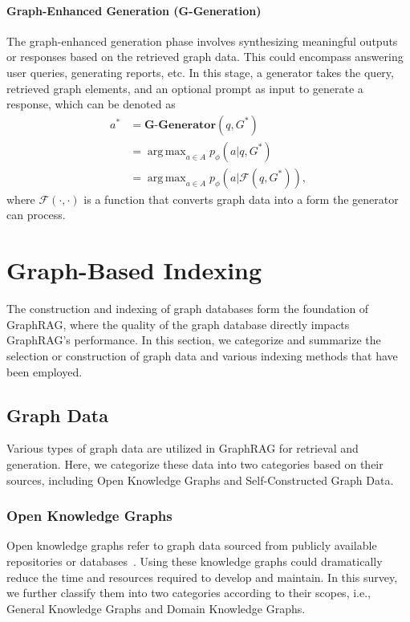 \documentclass[acmsmall]{acmart}
\DeclareMathOperator*{\argmax}{arg\,max}
\begin{document}
\paragraph{Graph-Enhanced Generation (G-Generation)} 
The graph-enhanced generation phase involves synthesizing meaningful outputs or responses based on the retrieved graph data. This could encompass answering user queries, generating reports, etc. In this stage, a generator takes the query, retrieved graph elements, and an optional prompt as input to generate a response, which can be denoted as
\begin{equation}
    \begin{aligned}
    a^* &= \textbf{G-Generator}(q, G^*) \\
    &= \argmax_{a \in A} p_\phi (a|q,G^*) \\
    &= \argmax_{a \in A} p_\phi (a|\mathcal{F}(q,G^*)),
    \end{aligned}
\end{equation}
where $\mathcal{F}(\cdot,\cdot)$ is a function that converts graph data into a form the generator can process.

\section{Graph-Based Indexing}
\label{sec:indexing}
The construction and indexing of graph databases form the foundation of GraphRAG, where the quality of the graph database directly impacts GraphRAG's performance. In this section, we categorize and summarize the selection or construction of graph data and various indexing methods that have been employed.

\subsection{Graph Data}
Various types of graph data are utilized in GraphRAG for retrieval and generation. Here, we categorize these data into two categories based on their sources, including Open Knowledge Graphs and Self-Constructed Graph Data.

\subsubsection{Open Knowledge Graphs}
Open knowledge graphs refer to graph data sourced from publicly available repositories or databases~\cite{ref:wikidata,ref:freebase,ref:dbpedia,ref:yago}. Using these knowledge graphs could dramatically reduce the time and resources required to develop and maintain. In this survey, we further classify them into two categories according to their scopes, i.e., General Knowledge Graphs and Domain Knowledge Graphs.
\end{document}
